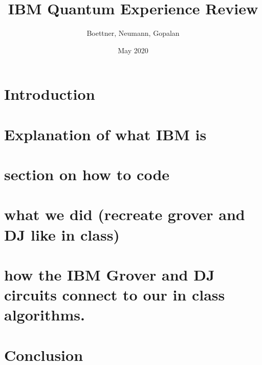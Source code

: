 \documentclass{article}
\title{IBM Quantum Experience Review}
\author{Boettner, Neumann, Gopalan }
\date{May 2020}
\begin{document}
\maketitle

\section{Introduction}
\section{Explanation of what IBM is}
\section{section on how to code}
    
        

\section{what we did (recreate grover and DJ like in class)}
\section{how the IBM Grover and DJ circuits connect to our in class algorithms.}
\section{Conclusion}
\end{document}

